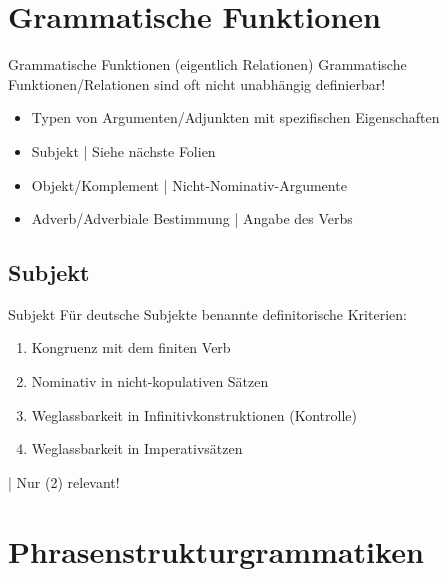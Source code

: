 \section{Grammatische Funktionen}

\begin{frame}
  {Grammatische Funktionen (eigentlich Relationen)}
  \onslide<+->
  \onslide<+->
  Grammatische Funktionen\slash Relationen sind oft nicht unabhängig definierbar!\\
  \Zeile
  \begin{itemize}[<+->]
    \item Typen von Argumenten\slash Adjunkten mit spezifischen Eigenschaften
      \Halbzeile
    \item \alert{Subjekt} | Siehe nächste Folien
    \item \alert{Objekt}\slash \alert{Komplement} | Nicht-Nominativ-Argumente
    \item \alert{Adverb}\slash \alert{Adverbiale Bestimmung} | Angabe des Verbs
  \end{itemize}
\end{frame}

\subsection{Subjekt}

\begin{frame}
  {Subjekt}
  \onslide<+->
  \onslide<+->
  Für \alert{deutsche Subjekte} benannte definitorische Kriterien:\\
  \Halbzeile
  \begin{enumerate}[<+->]
    \item \alert{Kongruenz} mit dem finiten Verb
    \item \alert{Nominativ} in nicht-kopulativen Sätzen
    \item Weglassbarkeit in \alert{Infinitivkonstruktionen} (Kontrolle)
    \item Weglassbarkeit in \alert{Imperativsätzen}
  \end{enumerate}
  \Zeile
  \onslide<+->
  \citet{Reis82} | Nur (2) relevant!
\end{frame}


\section{Phrasenstrukturgrammatiken}

